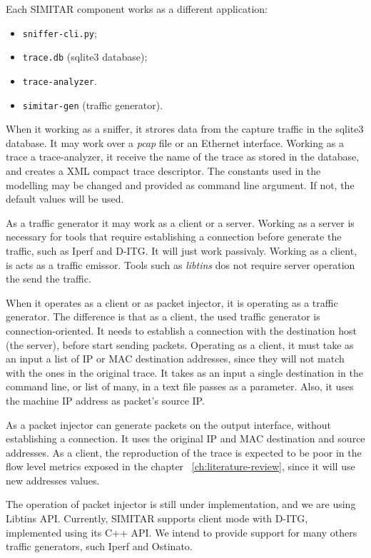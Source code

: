 Each SIMITAR component works as a different application:

\begin{itemize}
	\item \texttt{sniffer-cli.py};
	\item \texttt{trace.db} (sqlite3 database);
	\item \texttt{trace-analyzer}.
	\item \texttt{simitar-gen} (traffic generator).
\end{itemize}


When it working as a sniffer, it strores data from the capture traffic in the sqlite3 database. It may work over a \textit{pcap} file or an Ethernet interface. Working as a trace a trace-analyzer, it receive the name of the trace as stored in the database, and creates a XML compact trace descriptor. The constants used in the modelling may be changed and provided as command line argument. If not, the default values will be used. 

As a traffic generator it may work as a client or a server. Working as a server is necessary for tools that require establishing a connection before generate the traffic, such as Iperf and D-ITG. It will just work passivaly. Working as a client, is acts as a traffic emissor. Tools such as \textit{libtins} dos not require server operation the send the traffic. 

When it operates as a client or as packet injector, it is operating as a traffic generator. The difference is that as a client, the used traffic generator is connection-oriented. It needs to establish a connection with the destination host (the server), before start sending packets. Operating as a client, it must take as an input a list of IP or MAC destination addresses, since they will not match with the ones in the original trace. It takes as an input a single destination in the command line, or list of many, in a text file passes as a parameter. Also, it uses the machine IP address as packet's source IP.

 As a packet injector can generate packets on the output interface, without establishing a connection. It uses the original IP and MAC destination and source addresses. As a client, the reproduction of the trace is expected to be poor in the flow level metrics exposed in the chapter ~\ref{ch:literature-review}, since it will use new addresses values. 

The operation of packet injector is still under implementation, and we are using Libtins API. Currently, SIMITAR supports client mode with D-ITG, implemented using its C++ API. We intend to provide support for many others traffic generators, such Iperf and Ostinato.

